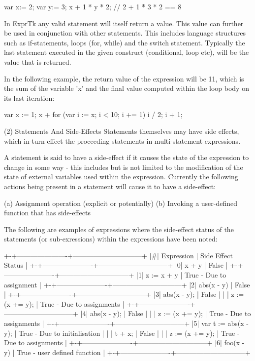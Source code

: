 var x:= 2;
var y:= 3;
x + 1 * y * 2;   // 2 + 1 * 3 * 2 == 8


In ExprTk any valid statement  will itself return a value.  This value
can  further  be  used  in  conjunction  with  other  statements. This
includes language structures such as if-statements, loops (for, while)
and the switch statement. Typically the last statement executed in the
given construct  (conditional, loop  etc), will  be the  value that is
returned.

In the following example, the  return value of the expression  will be
11, which is the sum of the variable 'x' and the final value  computed
within the loop body on its last iteration:

var x := 1;
x + for (var i := x; i < 10; i += 1)
{
i / 2;
i + 1;
}


(2) Statements And Side-Effects
Statements themselves may have side effects, which in-turn effect  the
proceeding statements in multi-statement expressions.

A statement is said  to have a side-effect  if it causes the  state of
the  expression to  change in  some way  -  this  includes but  is not
limited to the  modification of the  state of external  variables used
within the expression. Currently  the following actions being  present
in a statement will cause it to have a side-effect:

(a) Assignment operation (explicit or potentially)
(b) Invoking a user-defined function that has side-effects

The following are examples of expressions where the side-effect status
of the statements (or sub-exressions) within the expressions have been
noted:

+-+----------------------+------------------------------+
|\#|      Expression      |      Side Effect Status      |
+-+----------------------+------------------------------+
|0| x + y                | False                        |
+-+----------------------+------------------------------+
|1| z := x + y           | True - Due to assignment     |
+-+----------------------+------------------------------+
|2| abs(x - y)           | False                        |
+-+----------------------+------------------------------+
|3| abs(x - y);          | False                        |
| | z := (x += y);       | True - Due to assignments    |
+-+----------------------+------------------------------+
|4| abs(x - y);          | False                        |
| | z := (x += y);       | True - Due to assignments    |
+-+----------------------+------------------------------+
|5| var t := abs(x - y); | True - Due to initialisation |
| | t + x;               | False                        |
| | z := (x += y);       | True - Due to assignments    |
+-+----------------------+------------------------------+
|6| foo(x - y)           | True - user defined function |
+-+----------------------+------------------------------+


